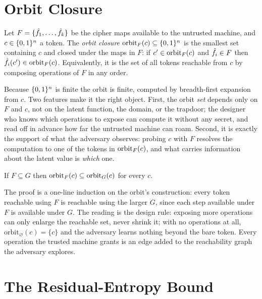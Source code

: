\section{Orbit Closure}
\label{sec:orbit-closure-def}

\begin{definition}
\label{def:orbit}
Let $F = \{\hat{f}_1, \ldots, \hat{f}_k\}$ be the cipher maps available to the
untrusted machine, and $c \in \{0,1\}^n$ a token. The \emph{orbit closure}
$\operatorname{orbit}_F(c) \subseteq \{0,1\}^n$ is the smallest set containing $c$ and closed
under the maps in $F$: if $c' \in \operatorname{orbit}_F(c)$ and $\hat{f}_i \in F$ then
$\hat{f}_i(c') \in \operatorname{orbit}_F(c)$. Equivalently, it is the set of all tokens
reachable from $c$ by composing operations of $F$ in any order.
\end{definition}

Because $\{0,1\}^n$ is finite the orbit is finite, computed by breadth-first
expansion from $c$. Two features make it the right object. First, the orbit
\emph{set} depends only on $F$ and $c$, not on the latent function, the
domain, or the trapdoor; the designer who knows which operations to expose
can compute it without any secret, and read off in advance how far the
untrusted machine can roam. Second, it is exactly the support of what the
adversary observes: probing $c$ with $F$ resolves the computation to one of
the tokens in $\operatorname{orbit}_F(c)$, and what carries information about the latent
value is \emph{which} one.

\begin{theorem}[Monotonicity]
\label{thm:monotonicity}
If $F \subseteq G$ then $\operatorname{orbit}_F(c) \subseteq \mathrm{orbit}_G(c)$ for every
$c$.
\end{theorem}

The proof is a one-line induction on the orbit's construction: every token
reachable using $F$ is reachable using the larger $G$, since each step
available under $F$ is available under $G$. The reading is the design rule:
exposing more operations can only enlarge the reachable set, never shrink
it; with no operations at all, $\mathrm{orbit}_{\varnothing}(c) = \{c\}$ and
the adversary learns nothing beyond the bare token. Every operation the
trusted machine grants is an edge added to the reachability graph the
adversary explores.

\section{The Residual-Entropy Bound}
\label{sec:residual-entropy}

